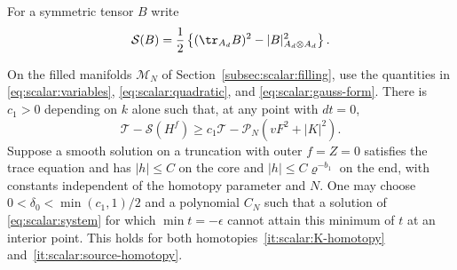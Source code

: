 For a symmetric tensor $B$ write
\begin{equation}\label{eq:scalar:gauss-form}
 \mathcal S(B)=\frac12\left\{(\tr_{A_d}B)^2
                                      -|B|_{A_d\otimes A_d}^2\right\}.
\end{equation}

\begin{lemma}\label{lem:scalar:floor}
On the filled manifolds $\mathcal M_N$ of
Section~\ref{subsec:scalar:filling}, use the quantities in
\eqref{eq:scalar:variables}, \eqref{eq:scalar:quadratic}, and
\eqref{eq:scalar:gauss-form}.  There is $c_1>0$ depending on $k$
alone such that, at any point with $dt=0$,
\begin{equation}
 \mathcal T-\mathcal S(H^f)
       \geq c_1\mathcal T-\mathcal P_N(vF^2+|K|^2).
 \label{eq:scalar:floor-algebra}
\end{equation}
Suppose a smooth solution on a truncation with outer $f=Z=0$
satisfies the trace equation and has $|h|\leq C$ on
the core and $|h|\leq C\varrho^{-b_1}$ on the end, with constants
independent of the homotopy parameter and $N$.  One may choose
$0<\delta_0<\min(c_1,1)/2$ and a polynomial $C_N$ such that a solution
of \eqref{eq:scalar:system} for which $\min t=-\epsilon$
cannot attain this minimum of $t$ at an interior point.  This holds
for both homotopies~\ref{it:scalar:K-homotopy}
and~\ref{it:scalar:source-homotopy}.
\end{lemma}

